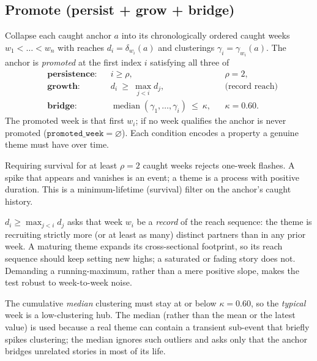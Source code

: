 \documentclass[11pt]{article}
\renewcommand{\deg}{\delta}                               %
\newcommand{\clu}{\gamma}                                 %
\theoremstyle{definition}
\theoremstyle{remark}
\begin{document}
\subsection{Promote (persist + grow + bridge)}
Collapse each caught anchor $a$ into its chronologically ordered caught weeks
$w_1<\dots<w_n$ with reaches $d_i=\deg_{w_i}(a)$ and clusterings $\clu_i=\clu_{w_i}(a)$.
The anchor is \emph{promoted} at the first index $i$ satisfying all three of
\begin{align}
&\textbf{persistence:} && i\ge \rho, &&\rho=2, \label{eq:persist}\\
&\textbf{growth:}      && d_i\ \ge\ \max_{j<i} d_j, &&\text{(record reach)} \label{eq:grow}\\
&\textbf{bridge:}      && \operatorname{median}(\clu_1,\dots,\clu_i)\ \le\ \kappa, &&\kappa=0.60. \label{eq:bridge}
\end{align}
The promoted week is that first $w_i$; if no week qualifies the anchor is never promoted
($\texttt{promoted\_week}=\varnothing$). Each condition encodes a property a genuine theme
must have over time.

\begin{description}[leftmargin=1.6em,style=nextline]
  \item[Persistence \eqref{eq:persist}.] Requiring survival for at least $\rho=2$ caught weeks
        rejects one-week flashes. A spike that appears and vanishes is an event; a theme is a
        process with positive duration. This is a minimum-lifetime (survival) filter on the
        anchor's caught history.
  \item[Growth \eqref{eq:grow}.] $d_i\ge\max_{j<i}d_j$ asks that week $w_i$ be a \emph{record}
        of the reach sequence: the theme is recruiting strictly more (or at least as many)
        distinct partners than in any prior week. A maturing theme expands its cross-sectional
        footprint, so its reach sequence should keep setting new highs; a saturated or fading
        story does not. Demanding a running-maximum, rather than a mere positive slope, makes
        the test robust to week-to-week noise.
  \item[Bridge \eqref{eq:bridge}.] The cumulative \emph{median} clustering must stay at or below
        $\kappa=0.60$, so the \emph{typical} week is a low-clustering hub. The median (rather
        than the mean or the latest value) is used because a real theme can contain a transient
        sub-event that briefly spikes clustering; the median ignores such outliers and asks only
        that the anchor bridges unrelated stories in most of its life.
\end{description}
\end{document}

